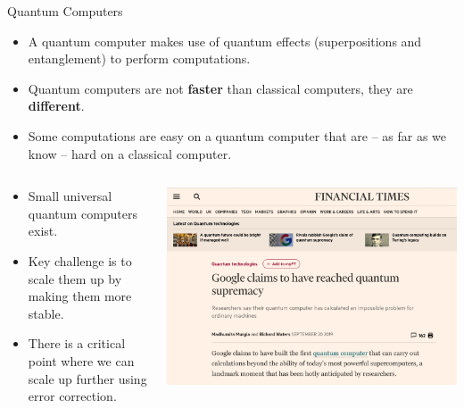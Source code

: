 \documentclass[xcolor=table,10pt,aspectratio=169]{beamer}
\begin{document}
\begin{frame}[label={sec:org8788375}]{Quantum Computers}
\begin{itemize}
\item A quantum computer makes use of quantum effects (superpositions and entanglement) to perform computations.
\item Quantum computers are not \textbf{faster} than classical computers, they are \textbf{different}.
\item Some computations are easy on a quantum computer that are – as far as we know – hard on a classical computer.
\end{itemize}

\begin{columns}[t]
\begin{column}{0.6\columnwidth}
\begin{itemize}
\item Small universal quantum computers exist.
\item Key challenge is to scale them up by making them more stable.
\item There is a critical point where we can scale up further using error correction.
\end{itemize}
\end{column}

\begin{column}{0.4\columnwidth}
\begin{center}
\includegraphics[width=.9\linewidth]{./google-72-qubit.png}
\end{center}
\end{column}
\end{columns}
\end{frame}
\end{document}
